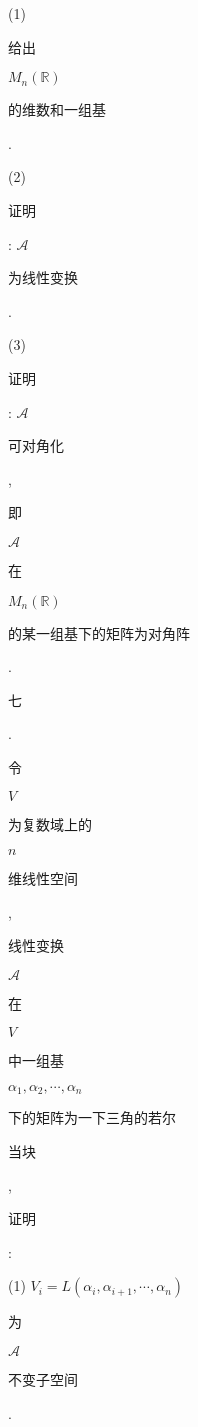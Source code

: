 \documentclass[10pt]{article}
\begin{document}
(1) \begin{CJK}{UTF8}{mj}给出\end{CJK} $M_{n}(\mathbb{R})$ \begin{CJK}{UTF8}{mj}的维数和一组基\end{CJK}.

(2) \begin{CJK}{UTF8}{mj}证明\end{CJK}: $\mathscr{A}$ \begin{CJK}{UTF8}{mj}为线性变换\end{CJK}.

(3) \begin{CJK}{UTF8}{mj}证明\end{CJK}: $\mathscr{A}$ \begin{CJK}{UTF8}{mj}可对角化\end{CJK}, \begin{CJK}{UTF8}{mj}即\end{CJK} $\mathscr{A}$ \begin{CJK}{UTF8}{mj}在\end{CJK} $M_{n}(\mathbb{R})$ \begin{CJK}{UTF8}{mj}的某一组基下的矩阵为对角阵\end{CJK}.

\begin{CJK}{UTF8}{mj}七\end{CJK}. \begin{CJK}{UTF8}{mj}令\end{CJK} $V$ \begin{CJK}{UTF8}{mj}为复数域上的\end{CJK} $n$ \begin{CJK}{UTF8}{mj}维线性空间\end{CJK}, \begin{CJK}{UTF8}{mj}线性变换\end{CJK} $\mathscr{A}$ \begin{CJK}{UTF8}{mj}在\end{CJK} $V$ \begin{CJK}{UTF8}{mj}中一组基\end{CJK} $\alpha_{1}, \alpha_{2}, \cdots, \alpha_{n}$ \begin{CJK}{UTF8}{mj}下的矩阵为一下三角的若尔\end{CJK} \begin{CJK}{UTF8}{mj}当块\end{CJK}, \begin{CJK}{UTF8}{mj}证明\end{CJK}:

(1) $V_{i}=L\left(\alpha_{i}, \alpha_{i+1}, \cdots, \alpha_{n}\right)$ \begin{CJK}{UTF8}{mj}为\end{CJK} $\mathscr{A}$ \begin{CJK}{UTF8}{mj}不变子空间\end{CJK}.
\end{document}
